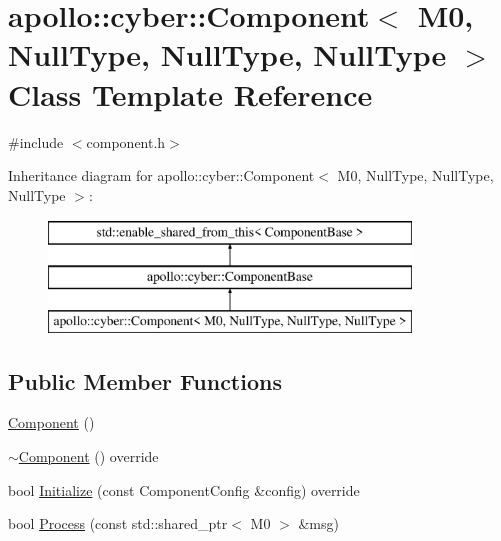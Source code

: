 \hypertarget{classapollo_1_1cyber_1_1Component_3_01M0_00_01NullType_00_01NullType_00_01NullType_01_4}{\section{apollo\-:\-:cyber\-:\-:Component$<$ M0, Null\-Type, Null\-Type, Null\-Type $>$ Class Template Reference}
\label{classapollo_1_1cyber_1_1Component_3_01M0_00_01NullType_00_01NullType_00_01NullType_01_4}
}


{\ttfamily \#include $<$component.\-h$>$}

Inheritance diagram for apollo\-:\-:cyber\-:\-:Component$<$ M0, Null\-Type, Null\-Type, Null\-Type $>$\-:\begin{figure}[H]
\begin{center}
\leavevmode
\includegraphics[height=3.000000cm]{classapollo_1_1cyber_1_1Component_3_01M0_00_01NullType_00_01NullType_00_01NullType_01_4}
\end{center}
\end{figure}
\subsection*{Public Member Functions}
\begin{DoxyCompactItemize}
\item 
\hyperlink{classapollo_1_1cyber_1_1Component_3_01M0_00_01NullType_00_01NullType_00_01NullType_01_4_ab60cf2e080f214df6cff585a30f46819}{Component} ()
\item 
\hyperlink{classapollo_1_1cyber_1_1Component_3_01M0_00_01NullType_00_01NullType_00_01NullType_01_4_a69ff6100886963072387ebd81c7d7b16}{$\sim$\-Component} () override
\item 
bool \hyperlink{classapollo_1_1cyber_1_1Component_3_01M0_00_01NullType_00_01NullType_00_01NullType_01_4_a9e859b2698539158448b19aa156f48d6}{Initialize} (const Component\-Config \&config) override
\item 
bool \hyperlink{classapollo_1_1cyber_1_1Component_3_01M0_00_01NullType_00_01NullType_00_01NullType_01_4_a99ec1c8222855604b21f2f5d17e15638}{Process} (const std\-::shared\-\_\-ptr$<$ M0 $>$ \&msg)
\end{DoxyCompactItemize}
